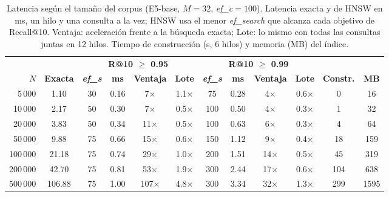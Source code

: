 \begin{table}[tbp]
\caption{Latencia según el tamaño del corpus (E5-base, $M=32$, \textit{ef\_c}$=100$). Latencia exacta y de HNSW en ms, un hilo y una consulta a la vez; HNSW usa el menor \textit{ef\_search} que alcanza cada objetivo de Recall@10. Ventaja: aceleración frente a la búsqueda exacta; Lote: lo mismo con todas las consultas juntas en 12 hilos. Tiempo de construcción (s, 6 hilos) y memoria (MB) del índice.}\label{tab:escalabilidad_e5_base}
\centering
\small
\begin{tabular}{|r|c|c|c|c|c|c|c|c|c|c|c|}
\hline
 & & \multicolumn{4}{c|}{\textbf{R@10 $\geq$ 0.95}} & \multicolumn{4}{c|}{\textbf{R@10 $\geq$ 0.99}} & & \\ \cline{3-10}
\textbf{$N$} & \textbf{Exacta} & \textbf{\textit{ef\_s}} & \textbf{ms} & \textbf{Ventaja} & \textbf{Lote} & \textbf{\textit{ef\_s}} & \textbf{ms} & \textbf{Ventaja} & \textbf{Lote} & \textbf{Constr.} & \textbf{MB} \\
\hline
5\,000 & 1.10 & 30 & 0.16 & 7$\times$ & 1.1$\times$ & 75 & 0.28 & 4$\times$ & 0.6$\times$ & 0 & 16 \\
10\,000 & 2.17 & 50 & 0.30 & 7$\times$ & 0.5$\times$ & 100 & 0.50 & 4$\times$ & 0.3$\times$ & 1 & 32 \\
20\,000 & 3.83 & 50 & 0.34 & 11$\times$ & 0.5$\times$ & 100 & 0.63 & 6$\times$ & 0.3$\times$ & 4 & 64 \\
50\,000 & 9.88 & 75 & 0.66 & 15$\times$ & 0.6$\times$ & 150 & 1.12 & 9$\times$ & 0.4$\times$ & 18 & 159 \\
100\,000 & 21.18 & 75 & 0.74 & 29$\times$ & 1.0$\times$ & 200 & 1.51 & 14$\times$ & 0.5$\times$ & 45 & 319 \\
200\,000 & 42.70 & 75 & 0.81 & 53$\times$ & 1.9$\times$ & 300 & 2.44 & 17$\times$ & 0.6$\times$ & 104 & 638 \\
500\,000 & 106.88 & 75 & 1.00 & 107$\times$ & 4.8$\times$ & 300 & 3.34 & 32$\times$ & 1.3$\times$ & 299 & 1595 \\
\hline
\end{tabular}
\end{table}